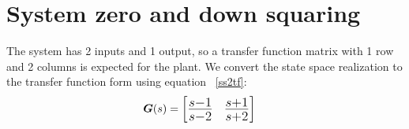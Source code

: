 \section{System zero and down squaring}
\begin{comment}
The state-space matrices of the system in minimal realization are as follows:
\begin{align*}
    \bm{A} = 
    \begin{bmatrix}
        2&0\\
        0&-2
    \end{bmatrix}, \bm{B} = 
    \begin{bmatrix}
        1&0\\
        0&1
    \end{bmatrix}\\
    \bm{C} = 
    \begin{bmatrix}
        1&-1
    \end{bmatrix},
    \bm{D} = 
    \begin{bmatrix}
        1&1
    \end{bmatrix}
\end{align*}
\end{comment}
The system has 2 inputs and 1 output, so a transfer function matrix with 1 row and 2 columns is expected for the plant. We convert the state space realization to the transfer function form using equation ~\eqref{ss2tf}:
\begin{align*}
    \bm{G}(s)&=
    {\LARGE
    \begin{bmatrix}
        \frac{s - 1}{s - 2} & \frac{s + 1}{s + 2} \\
    \end{bmatrix}}
\end{align*}
